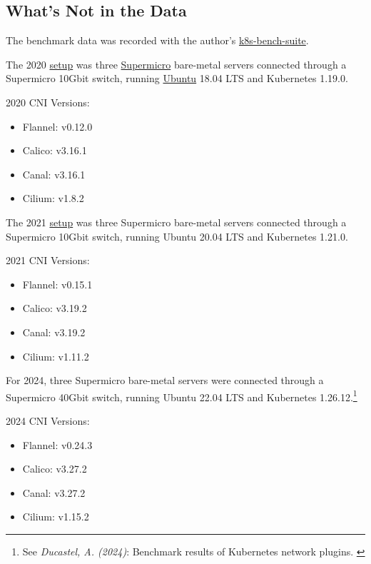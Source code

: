 \subsection{What's Not in the Data}

The benchmark data was recorded with the author's \href{https://github.com/InfraBuilder/k8s-bench-suite}{k8s-bench-suite}.

The 2020 \href{https://github.com/InfraBuilder/benchmark-k8s-cni-2020-08/blob/master/PROTOCOL.md}{setup} was three \href{https://www.supermicro.com/en/}{Supermicro} bare-metal servers connected through a Supermicro 10Gbit switch, running \href{https://ubuntu.com/server}{Ubuntu} 18.04 LTS and Kubernetes 1.19.0.

2020 CNI Versions:
\begin{itemize}
    \item Flannel: v0.12.0
    \item Calico: v3.16.1
    \item Canal: v3.16.1
    \item Cilium: v1.8.2
\end{itemize}

The 2021 \href{https://github.com/InfraBuilder/benchmark-k8s-cni-2021-05/blob/main/PROTOCOL.md}{setup} was three Supermicro bare-metal servers connected through a Supermicro 10Gbit switch, running Ubuntu 20.04 LTS and Kubernetes 1.21.0.

2021 CNI Versions:
\begin{itemize}
    \item Flannel: v0.15.1
    \item Calico: v3.19.2
    \item Canal: v3.19.2
    \item Cilium: v1.11.2
\end{itemize}

For 2024, three Supermicro bare-metal servers were connected through a Supermicro 40Gbit switch, running Ubuntu 22.04 LTS and Kubernetes 1.26.12.\footnote{See \textit{Ducastel, A. (2024)}: Benchmark results of Kubernetes network plugins. \cite{originalArticle}}

2024 CNI Versions:
\begin{itemize}
    \item Flannel: v0.24.3
    \item Calico: v3.27.2
    \item Canal: v3.27.2
    \item Cilium: v1.15.2
\end{itemize}

